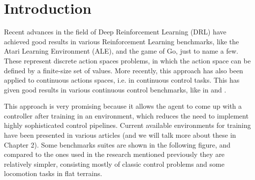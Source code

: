 \chapter{Introduction}
\label{ch:intro}



Recent advances in the field of Deep Reinforcement Learning (DRL) have achieved good
results in various Reinforcement Learning benchmarks, like the Atari Learning Environment (ALE), 
and the game of Go, just to name a few. These represent discrete action spaces problems, in which 
the action space can be defined by a finite-size set of values. More recently, this approach has also 
been applied to continuous actions spaces, i.e. in continuous control tasks. This has given good results 
in various continuous control benchmarks, like in \citeauthor{DeepmindEmergenceLocomotion}  and \citeauthor{DeepMimic}.

\figDrlLocomotionMotivation

This approach is very promising because it allows the agent to come up with a controller after training in
an environment, which reduces the need to implement highly sophisticated control pipelines. Current available 
environments for training have been presented in various articles (and we will talk more about these in Chapter 2).
Some benchmarks suites are shown in the following figure, and compared to the ones used in the research mentioned previously
they are relatively simpler, consisting mostly of classic control problems and some locomotion tasks in flat terrains.

